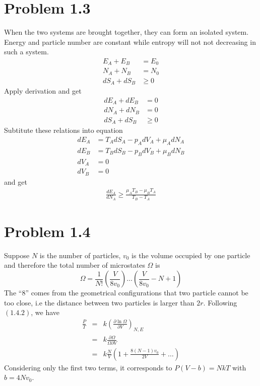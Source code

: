 \documentclass{article}
\begin{document}
\section*{Problem 1.3}
When the two systems are brought together, they can form an isolated system. Energy and particle number are constant while entropy will not not decreasing in such a system.\\
\begin{align}
E_A+E_B&=E_0\\
N_A+N_B&=N_0\\
dS_A+dS_B&\geq0
\end{align}
Apply derivation and get
\begin{align}
dE_A+dE_B&=0\\
dN_A+dN_B&=0\\
dS_A+dS_B&\geq0
\end{align}
Subtitute these relations into equation
\begin{align}
dE_A&=T_AdS_A-p_AdV_A+\mu_A dN_A\\
dE_B&=T_BdS_B-p_BdV_B+\mu_B dN_B\\
dV_A&=0\\
dV_B&=0
\end{align}
and get
\begin{align}
\frac{dE_A}{dN_A}\geq\frac{\mu_A T_B-\mu_B T_A}{T_B-T_A}
\end{align}

\section*{Problem 1.4}
Suppose $N$ is the number of particles, $v_{0}$ is the volume occupied by one particle and therefore the total number of microstates $\Omega$ is
\begin{equation}
\Omega = \frac{1}{N!}(\frac{V}{8v_{0}}) \dots (\frac{V}{8v_{0}}-N+1)
\end{equation}
The ``8'' comes from the geometrical configurations that two particle cannot be too close, i.e the distance between two particles is larger than $2r$. Following $(1.4.2)$, we have
\begin{eqnarray}
\frac{P}{T} &=& k \left(\frac{\partial \ln \Omega}{\partial V}\right)_{N,E} \\
&=& k \frac{\partial \Omega}{\Omega \partial V} \\
&=& k \frac{N}{V} \left(1+ \frac{8(N-1)v_{0}}{2V} + \dots \right)
\end{eqnarray}
Considering only the first two terms, it corresponds to $P(V-b) = NkT$ with $b=4N v_{0}$. \\
\end{document}

